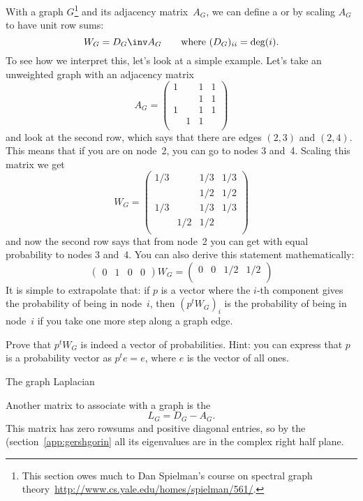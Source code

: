 With a graph $G$\footnote{This section owes much to Dan Spielman's course
on spectral graph theory~\url{http://www.cs.yale.edu/homes/spielman/561/}.}
and its adjacency matrix~$A_G$, we can define a
 or  by scaling
$A_G$ to have unit row sums:
\[ W_G = D_G\inv A_G\qquad \hbox{where $(D_G)_{ii}=\deg(i)$}. \]
To see how we interpret this, let's look at a simple example.
Let's take an unweighted graph with an adjacency matrix
\[
A_G = \begin{pmatrix}
1& &1&1\\
 & &1&1\\
1& &1&1\\
 &1&1& \\
\end{pmatrix}
\]
and look at the second row, which says that there are edges $(2,3)$ 
and $(2,4)$. This means that if you are on node~2, you can go 
to nodes 3 and~4. Scaling this matrix we get
\[
W_G = \begin{pmatrix}
1/3&   &1/3&1/3\\
   &   &1/2&1/2\\
1/3&   &1/3&1/3\\
   &1/2&1/2&   \\
\end{pmatrix}
\]
and now the second row says that from node~2 you can get
with equal probability to nodes 3 and~4.
You can also derive this statement mathematically:
\[
\begin{pmatrix}
0&1&0&0
\end{pmatrix} W_G =
\begin{pmatrix}
  0&  0&1/2&1/2\\
\end{pmatrix}
\]
It is simple to extrapolate that: if $p$ is a vector where the $i$-th
component gives the probability of being in node~$i$, then $(p^tW_G)_i$
is the probability of being in node~$i$ if you take one more
step along a graph edge.

\begin{exercise}
Prove that $p^tW_G$ is indeed a vector of probabilities. Hint: 
you can express that $p$ is a probability vector as $p^te=e$,
where $e$ is the vector of all ones.
\end{exercise}

 {The graph Laplacian}
\label{sec:graph-laplace}

Another matrix to associate with a graph is the
\[ L_G = D_G-A_G. \]
This matrix has zero rowsums and positive diagonal entries, so by the
 (section~\ref{app:gershgorin} all its eigenvalues
are in the complex right half plane. 


